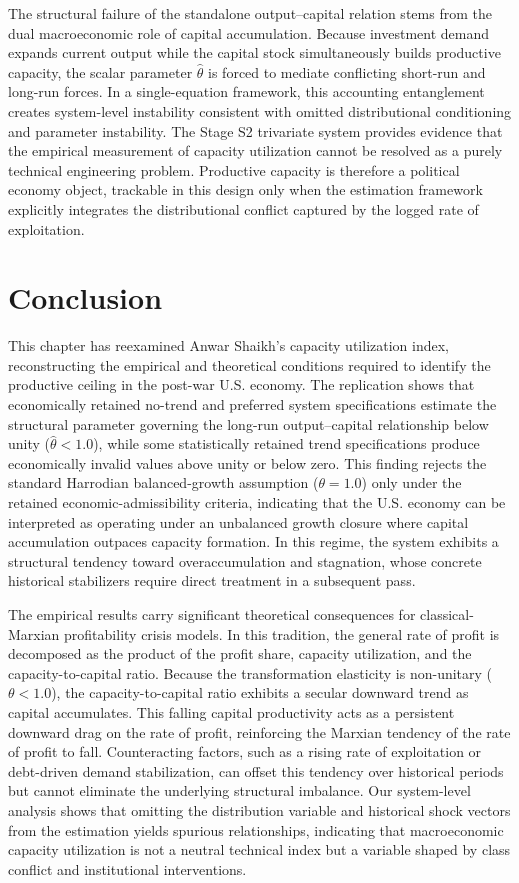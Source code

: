 \documentclass[11pt]{article}
\begin{document}
The structural failure of the standalone output--capital relation stems from the dual macroeconomic role of capital accumulation. Because investment demand expands current output while the capital stock simultaneously builds productive capacity, the scalar parameter $\hat{\theta}$ is forced to mediate conflicting short-run and long-run forces. In a single-equation framework, this accounting entanglement creates system-level instability consistent with omitted distributional conditioning and parameter instability. The Stage S2 trivariate system provides evidence that the empirical measurement of capacity utilization cannot be resolved as a purely technical engineering problem. Productive capacity is therefore a political economy object, trackable in this design only when the estimation framework explicitly integrates the distributional conflict captured by the logged rate of exploitation.

\section{Conclusion}
\label{sec:conclusion}

This chapter has reexamined Anwar Shaikh's capacity utilization index, reconstructing the empirical and theoretical conditions required to identify the productive ceiling in the post-war U.S. economy. The replication shows that economically retained no-trend and preferred system specifications estimate the structural parameter governing the long-run output--capital relationship below unity ($\hat{\theta} < 1.0$), while some statistically retained trend specifications produce economically invalid values above unity or below zero. This finding rejects the standard Harrodian balanced-growth assumption ($\theta = 1.0$) only under the retained economic-admissibility criteria, indicating that the U.S. economy can be interpreted as operating under an unbalanced growth closure where capital accumulation outpaces capacity formation. In this regime, the system exhibits a structural tendency toward overaccumulation and stagnation, whose concrete historical stabilizers require direct treatment in a subsequent pass.

The empirical results carry significant theoretical consequences for classical-Marxian profitability crisis models. In this tradition, the general rate of profit is decomposed as the product of the profit share, capacity utilization, and the capacity-to-capital ratio. Because the transformation elasticity is non-unitary ($\theta < 1.0$), the capacity-to-capital ratio exhibits a secular downward trend as capital accumulates. This falling capital productivity acts as a persistent downward drag on the rate of profit, reinforcing the Marxian tendency of the rate of profit to fall. Counteracting factors, such as a rising rate of exploitation or debt-driven demand stabilization, can offset this tendency over historical periods but cannot eliminate the underlying structural imbalance. Our system-level analysis shows that omitting the distribution variable and historical shock vectors from the estimation yields spurious relationships, indicating that macroeconomic capacity utilization is not a neutral technical index but a variable shaped by class conflict and institutional interventions.
\end{document}
